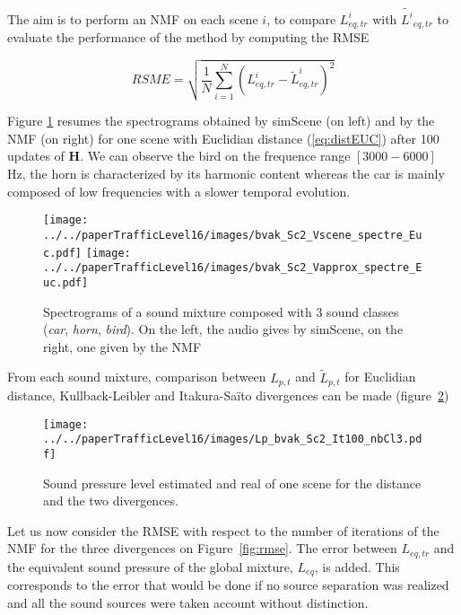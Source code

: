 \documentclass{article}
\begin{document}
\begin{sloppy}
The aim is to perform an NMF on each scene $i$, to compare $L^i_{eq,tr}$ with $\tilde{L^i}_{eq,tr}$ to evaluate the performance of the method by computing the RMSE

\begin{equation}
RSME = \sqrt{\frac{1}{N}\sum_{i = 1}^N(L^i_{eq,tr}-\tilde{L}^i_{eq,tr})^2}
\end{equation}

Figure \ref{fig:spectrogram} resumes the spectrograms obtained by simScene (on left) and by the NMF (on right) for one scene with Euclidian distance (\ref{eq:distEUC}) after 100 updates of $\mathbf{H}$. We can observe the bird on the frequence range $\left[3000-6000\right]$ Hz, the horn is characterized by its harmonic content whereas the car is mainly composed of low frequencies with a slower temporal evolution.\\

\begin{figure}[t]
\centering
\texttt{[image: ../../paperTrafficLevel16/images/bvak\_Sc2\_Vscene\_spectre\_Euc.pdf]}
\texttt{[image: ../../paperTrafficLevel16/images/bvak\_Sc2\_Vapprox\_spectre\_Euc.pdf]}
\caption{Spectrograms of a sound mixture composed with 3 sound classes (\textit{car}, \textit{horn}, \textit{bird}). On the left, the audio gives by simScene, on the right, one given by the NMF}
\label{fig:spectrogram}
\end{figure}


From each sound mixture, comparison between $L_{p,t}$ and $\tilde{L}_{p,t}$ for Euclidian distance, Kullback-Leibler and Itakura-Saïto divergences can be made (figure~\ref{fig:Lp})\\

\begin{figure}[t]
\centering
\centerline{\texttt{[image: ../../paperTrafficLevel16/images/Lp\_bvak\_Sc2\_It100\_nbCl3.pdf]}}
\caption{Sound pressure level estimated and real of one scene for the distance and the two divergences.}
\label{fig:Lp}
\end{figure}

Let us now consider the RMSE with respect to the number of iterations of the NMF for the three divergences on Figure~\ref{fig:rmse}. The error between $L_{eq,tr}$ and the equivalent sound pressure of the global mixture, $L_{eq}$, is added. This corresponds to the error that would be done if no source separation was realized and all the sound sources were taken account without distinction.\\


\end{sloppy}
\end{document}
